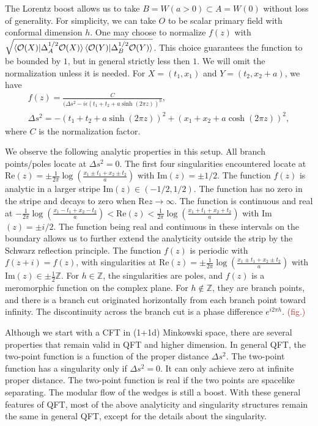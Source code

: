 \documentclass[a4paper,11pt]{article}
\theoremstyle{definition}
\newcommand{\mO}{\mathcal{O}}
\newcommand{\KL}[1]{\textcolor{brown}{#1}}
\begin{document}
The Lorentz boost allows us to take $B = W(a>0) \subset A = W(0)$ without loss of generality. For simplicity, we can take $O$ to be scalar primary field with conformal dimension $h$. One may choose to normalize $f(z)$ with $\sqrt{\braket{\mO(X)|\Delta_A^{1/2}\mO(X)}\braket{\mO(Y)|\Delta_B^{1/2}\mO(Y)}}$. This choice guarantees the function to be bounded by $1$, but in general strictly less then $1$. We will omit the normalization unless it is needed. For $X = (t_1,x_1)$ and $Y = (t_2,x_2+a)$, we have
\begin{gather}
    f(z) = \frac{C}{(\Delta s^2-i\epsilon(t_1+t_2+a\sinh(2\pi z))^{h}},\nonumber\\
    \Delta s^2 = -(t_1+t_2+a\sinh(2\pi z))^2 + (x_1+x_2 + a\cosh(2\pi z))^2,
\end{gather}
where $C$ is the normalization factor. 

We observe the following analytic properties in this setup. All branch points/poles locate at $\Delta s^2 = 0$. The first four singularities encountered locate at Re$(z) = \pm\frac{1}{2\pi}\log(\frac{x_1\pm t_1+x_2\pm t_2}{a})$ with Im$(z) = \pm 1/2$. The function $f(z)$ is analytic in a larger stripe Im$(z)\in (-1/2,1/2)$. The function has no zero in the stripe and decays to zero when Re$z \to \infty$. The function is continuous and real at $-\frac{1}{2\pi}\log(\frac{x_1- t_1+x_2- t_2}{a})<\text{Re}(z)< \frac{1}{2\pi}\log(\frac{x_1+ t_1+x_2+ t_2}{a})$ with Im$(z) = \pm i/2$. The function being real and continuous in these intervals on the boundary allows us to further extend the analyticity outside the strip by the Schwarz reflection principle. The function $f(z)$ is periodic with $f(z+i) = f(z)$, with singularities at Re$(z) = \pm\frac{1}{2\pi}\log(\frac{x_1\pm t_1+x_2\pm t_2}{a})$ with Im$(z) \in \pm \frac{1}{2}\mathbb{Z}$. For $h \in \mathbb{Z}$, the singularities are poles, and $f(z)$ is a meromorphic function on the complex plane. For $h \notin \mathbb{Z}$, they are branch points, and there is a branch cut originated horizontally from each branch point toward infinity. The discontinuity across the branch cut is a phase difference $e^{i2\pi h}$.  \KL{(fig.)}

Although we start with a CFT in (1+1d) Minkowski space, there are several properties that remain valid in QFT and higher dimension. In general QFT, the two-point function is a function of the proper distance $\Delta s^2$. The two-point function has a singularity only if $\Delta s^2 = 0$. It can only achieve zero at infinite proper distance. The two-point function is real if the two points are spacelike separating. The modular flow of the wedges is still a boost. With these general features of QFT, most of the above analyticity and singularity structures remain the same in general QFT, except for the details about the singularity. 
\end{document}
